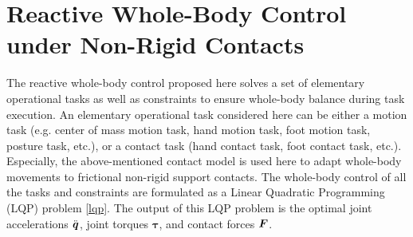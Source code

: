 \documentclass[letterpaper, 10 pt, conference]{ieeeconf}  %
\newcommand{\vect}[1]{\mbox{\boldmath${#1}$}}%
\begin{document}
\section{Reactive Whole-Body Control under Non-Rigid Contacts}
\label{Section:control}
The reactive whole-body control proposed here solves a set of elementary operational tasks as well as constraints to ensure whole-body balance during task execution. An elementary operational task considered here can be either a motion task (e.g. center of mass motion task, hand motion task, foot motion task, posture task, etc.), or a contact task (hand contact task, foot contact task, etc.). Especially, the above-mentioned contact model is used here to adapt whole-body movements to frictional non-rigid support contacts. The whole-body control of all the tasks and constraints are formulated as a Linear Quadratic Programming (LQP) problem \eqref{lqp}. The output of this LQP problem is the optimal joint accelerations $\ddot{\vect{q}}$, joint torques $\boldsymbol{\tau}$, and contact forces $\vect{F}$.
\end{document}
